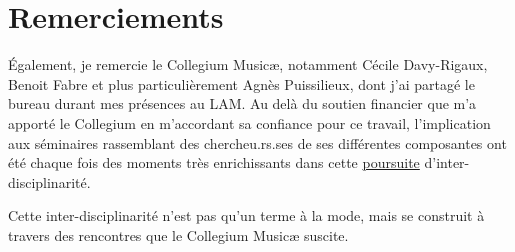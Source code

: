 %
\chapter*{Remerciements}
\label{sec:acknowledgement}
\vspace*{-10mm}






Également, je remercie le Collegium Musicæ, notamment Cécile Davy-Rigaux, Benoit Fabre et plus particulièrement Agnès Puissilieux, dont j'ai partagé le bureau durant mes présences au LAM. Au delà du soutien financier que m'a apporté le Collegium en m'accordant sa confiance pour ce travail, l'implication aux séminaires rassemblant des chercheu.rs.ses de ses différentes composantes ont été chaque fois des moments très enrichissants dans cette \ul{poursuite} d'inter-disciplinarité. 

Cette inter-disciplinarité n'est pas qu'un terme à la mode, mais se construit à travers des rencontres que le Collegium Musicæ suscite.



